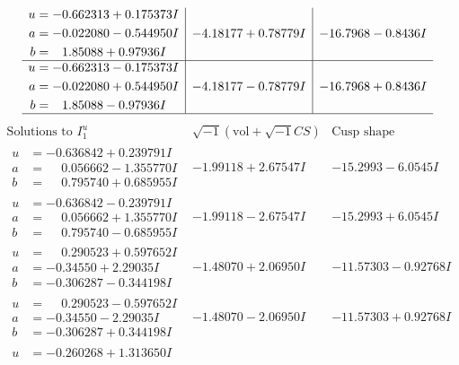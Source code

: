 \documentclass[1p]{elsarticle_modified}
\theoremstyle{definition}
\newcommand{\I}{\sqrt{-1}}
\begin{document}
$$\begin{array}{c|c|c}
\begin{aligned}
u &= -0.662313 + 0.175373 I \\
a &= -0.022080 - 0.544950 I \\
b &= \phantom{-}1.85088 + 0.97936 I\end{aligned}
 & -4.18177 + 0.78779 I & -16.7968 - 0.8436 I \\ \hline\begin{aligned}
u &= -0.662313 - 0.175373 I \\
a &= -0.022080 + 0.544950 I \\
b &= \phantom{-}1.85088 - 0.97936 I\end{aligned}
 & -4.18177 - 0.78779 I & -16.7968 + 0.8436 I\\
 \hline 
 \end{array}$$\newpage$$\begin{array}{c|c|c}  
\text{Solutions to }I^u_{1}& \I (\text{vol} + \sqrt{-1}CS) & \text{Cusp shape}\\
 \hline 
\begin{aligned}
u &= -0.636842 + 0.239791 I \\
a &= \phantom{-}0.056662 - 1.355770 I \\
b &= \phantom{-}0.795740 + 0.685955 I\end{aligned}
 & -1.99118 + 2.67547 I & -15.2993 - 6.0545 I \\ \hline\begin{aligned}
u &= -0.636842 - 0.239791 I \\
a &= \phantom{-}0.056662 + 1.355770 I \\
b &= \phantom{-}0.795740 - 0.685955 I\end{aligned}
 & -1.99118 - 2.67547 I & -15.2993 + 6.0545 I \\ \hline\begin{aligned}
u &= \phantom{-}0.290523 + 0.597652 I \\
a &= -0.34550 + 2.29035 I \\
b &= -0.306287 - 0.344198 I\end{aligned}
 & -1.48070 + 2.06950 I & -11.57303 - 0.92768 I \\ \hline\begin{aligned}
u &= \phantom{-}0.290523 - 0.597652 I \\
a &= -0.34550 - 2.29035 I \\
b &= -0.306287 + 0.344198 I\end{aligned}
 & -1.48070 - 2.06950 I & -11.57303 + 0.92768 I \\ \hline\begin{aligned}
u &= -0.260268 + 1.313650 I \\

\end{aligned}
\end{array}$$
\end{document}
